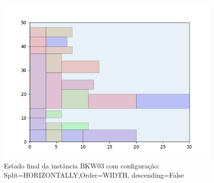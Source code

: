\begin{figure}[H]
    \centering
    \caption[]{Estado final da instância BKW03 com configuração: Split=HORIZONTALLY,Order=WIDTH, descending=False}
    \label{fig:bkw03-horizontally-width-false}
    \includegraphics[scale=0.5]{output/figures/bkw/bkw03/horizontally/width/false/00}
\end{figure}